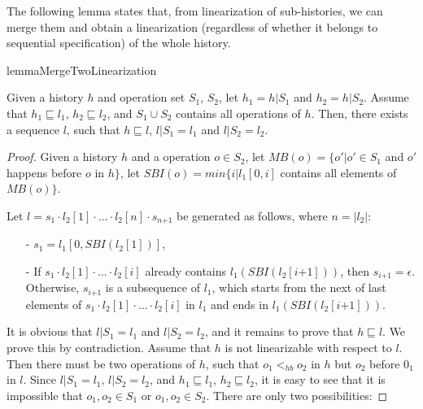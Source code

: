 \documentclass{llncs}
\begin{document}
The following lemma states that, from linearization of sub-histories, we can merge them and obtain a linearization (regardless of whether it belongs to sequential specification) of the whole history.

\begin{restatable}{lemma}{MergeTwoLinearization}
\label{lemma:merge two linearization}

Given a history $h$ and operation set $S_1$, $S_2$, let $h_1 = h \vert{S_1}$ and $h_2 = h \vert{S_2}$. Assume that $h_1 \sqsubseteq l_1$, $h_2 \sqsubseteq l_2$, and $S_1 \cup S_2$ contains all operations of $h$. Then, there exists a sequence $l$, such that $h \sqsubseteq l$, $l \vert{S_1} = l_1$ and $l \vert{S_2} = l_2$.
\end{restatable}

\begin {proof}

Given a history $h$ and a operation $o \in S_2$, let $\textit{MB}(o) = \{ o' \vert o' \in S_1$ and $o'$ happens before $o$ in $h \}$, let $\textit{SBI}(o) = \textit{min}\{ i \vert l_1[0,i]$ contains all elements of $\textit{MB}(o) \}$.

Let $l = s_1 \cdot l_2[1] \cdot \ldots \cdot l_2[n] \cdot s_{\textit{n+1}}$ be generated as follows, where $n = \vert l_2 \vert$:

\begin{itemize}
\setlength{\itemsep}{0.5pt}
\item[-] $s_1 = l_1[0, \textit{SBI}(l_2[1])]$,

\item[-] If $s_1 \cdot l_2[1] \cdot \ldots \cdot l_2[i]$ already contains $l_1(\textit{SBI}(l_2[\textit{i+1}]))$, then $s_{\textit{i+1}} = \epsilon$. Otherwise, $s_{\textit{i+1}}$ is a subsequence of $l_1$, which starts from the next of last elements of $s_1 \cdot l_2[1] \cdot \ldots \cdot l_2[i]$ in $l_1$ and ends in $l_1(\textit{SBI}(l_2[\textit{i+1}]))$.
\end{itemize}

It is obvious that $l \vert{S_1} = l_1$ and $l \vert{S_2} = l_2$, and it remains to prove that $h \sqsubseteq l$. We prove this by contradiction. Assume that $h$ is not linearizable with respect to $l$. Then there must be two operations of $h$, such that $o_1 <_{hb} o_2$ in $h$ but $o_2$ before $0_1$ in $l$. Since $l \vert{S_1} = l_1$, $l \vert{S_2} = l_2$, and $h_1 \sqsubseteq l_1$, $h_2 \sqsubseteq l_2$, it is easy to see that it is impossible that $o_1,o_2 \in S_1$ or $o_1,o_2 \in S_2$. There are only two possibilities:


\end{proof}
\end{document}
